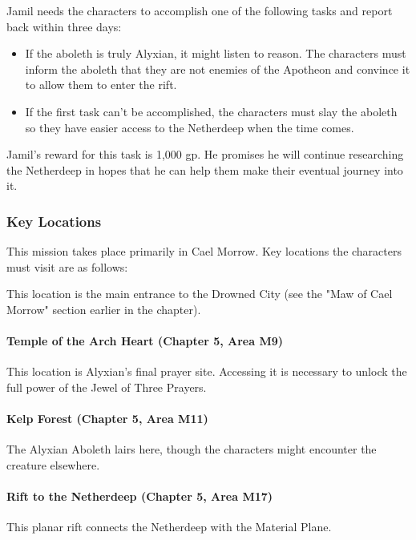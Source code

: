 \documentclass[10pt,a4paper,twoside,bg=print,twocolumn,openany,nodeprecatedcode]{dndbook}
\begin{document}
Jamil needs the characters to accomplish one of the following tasks and report back within three days:


\begin{itemize}
\item If the aboleth is truly Alyxian, it might listen to reason. The characters must inform the aboleth that they are not enemies of the Apotheon and convince it to allow them to enter the rift.
\item If the first task can't be accomplished, the characters must slay the aboleth so they have easier access to the Netherdeep when the time comes.
\end{itemize}

Jamil's reward for this task is 1,000 gp. He promises he will continue researching the Netherdeep in hopes that he can help them make their eventual journey into it.

\subsubsection{Key Locations}
This mission takes place primarily in Cael Morrow. Key locations the characters must visit are as follows:


\begin{description}[nolistsep]
\item[Maw of Cael Morrow.]
This location is the main entrance to the Drowned City (see the "Maw of Cael Morrow" section earlier in the chapter).
\end{description}

\paragraph{Temple of the Arch Heart (Chapter 5, Area M9)}
This location is Alyxian's final prayer site. Accessing it is necessary to unlock the full power of the Jewel of Three Prayers.

\paragraph{Kelp Forest (Chapter 5, Area M11)}
The Alyxian Aboleth lairs here, though the characters might encounter the creature elsewhere.

\paragraph{Rift to the Netherdeep (Chapter 5, Area M17)}
This planar rift connects the Netherdeep with the Material Plane.
\end{document}
